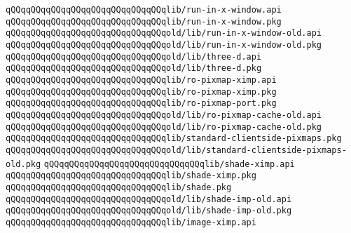 \newline
\verb|qQQqqQQqqQQqqQQqqQQqqQQqqQQqqQQqlib/run-in-x-window.api|\newline
\verb|qQQqqQQqqQQqqQQqqQQqqQQqqQQqqQQqlib/run-in-x-window.pkg|\newline
\newline
\verb|qQQqqQQqqQQqqQQqqQQqqQQqqQQqqQQqold/lib/run-in-x-window-old.api|\newline
\verb|qQQqqQQqqQQqqQQqqQQqqQQqqQQqqQQqold/lib/run-in-x-window-old.pkg|\newline
\newline
\verb|qQQqqQQqqQQqqQQqqQQqqQQqqQQqqQQqold/lib/three-d.api|\newline
\verb|qQQqqQQqqQQqqQQqqQQqqQQqqQQqqQQqold/lib/three-d.pkg|\newline
\newline
\verb|qQQqqQQqqQQqqQQqqQQqqQQqqQQqqQQqlib/ro-pixmap-ximp.api|\newline
\verb|qQQqqQQqqQQqqQQqqQQqqQQqqQQqqQQqlib/ro-pixmap-ximp.pkg|\newline
\verb|qQQqqQQqqQQqqQQqqQQqqQQqqQQqqQQqlib/ro-pixmap-port.pkg|\newline
\newline
\verb|qQQqqQQqqQQqqQQqqQQqqQQqqQQqqQQqold/lib/ro-pixmap-cache-old.api|\newline
\verb|qQQqqQQqqQQqqQQqqQQqqQQqqQQqqQQqold/lib/ro-pixmap-cache-old.pkg|\newline
\newline
\verb|qQQqqQQqqQQqqQQqqQQqqQQqqQQqqQQqlib/standard-clientside-pixmaps.pkg|\newline
\verb|qQQqqQQqqQQqqQQqqQQqqQQqqQQqqQQqold/lib/standard-clientside-pixmaps-old.pkg|\newline
\newline
\newline
\verb|qQQqqQQqqQQqqQQqqQQqqQQqqQQqqQQqlib/shade-ximp.api|\newline
\verb|qQQqqQQqqQQqqQQqqQQqqQQqqQQqqQQqlib/shade-ximp.pkg|\newline
\verb|qQQqqQQqqQQqqQQqqQQqqQQqqQQqqQQqlib/shade.pkg|\newline
\newline
\verb|qQQqqQQqqQQqqQQqqQQqqQQqqQQqqQQqold/lib/shade-imp-old.api|\newline
\verb|qQQqqQQqqQQqqQQqqQQqqQQqqQQqqQQqold/lib/shade-imp-old.pkg|\newline
\newline
\newline
\verb|qQQqqQQqqQQqqQQqqQQqqQQqqQQqqQQqlib/image-ximp.api|\newline
